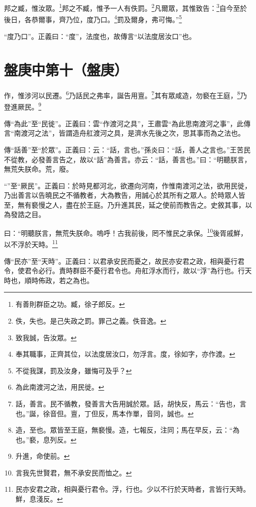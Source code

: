 邦之臧，惟汝眾。\footnote{有善則群臣之功。臧，徐子郎反。}邦之不臧，惟予一人有佚罰。\footnote{佚，失也。是己失政之罰。罪己之義。佚音逸。}凡爾眾，其惟致告：\footnote{致我誠，告汝眾。}自今至於後日，各恭爾事，齊乃位，度乃口。\footnote{奉其職事，正齊其位，以法度居汝口，勿浮言。度，徐如字，亦作渡。}罰及爾身，弗可悔。”\footnote{不從我謀，罰及汝身，雖悔可及乎？}

{\noindent\shu{}\fzkt “度乃口”。正義曰：“度”，法度也，故傳言“以法度居汝口”也。 \par}

\section{盤庚中第十（盤庚）}

作，惟涉河以民遷。\footnote{為此南渡河之法，用民徙。}乃話民之弗率，誕告用亶。\footnote{話，善言。民不循教，發善言大告用誠於眾。話，胡快反，馬云：“告也，言也。”誕，徐音但。亶，丁但反，馬本作單，音同，誠也。}其有眾咸造，勿褻在王庭，\footnote{造，至也。眾皆至王庭，無褻慢。造，七報反，注同；馬在早反，云：“為也。”褻，息列反。}乃登進厥民。\footnote{升進，命使前。}

{\noindent\zhuan{}\fzbyks 傳“為此”至“民徙”。正義曰：雲“作渡河之具”，王肅雲“為此思南渡河之事”，此傳言“南渡河之法”，皆謂造舟舡渡河之具，是濟水先後之次，思其事而為之法也。 \par}

{\noindent\zhuan{}\fzbyks 傳“話善”至“於眾”。正義曰：云：“話，言也。”孫炎曰：“話，善人之言也。”王苦民不從教，必發善言告之，故以“話”為善言。亦云：“話，善言也。”曰：“明聽朕言，無荒失朕命。荒，廢。 \par}

{\noindent\shu{}\fzkt “”至“厥民”。正義曰：於時見都河北，欲遷向河南，作惟南渡河之法，欲用民徙，乃出善言以告曉民之不循教者，大為教告，用誠心於其所有之眾人。於時眾人皆至，無有褻慢之人，盡在於王庭。乃升進其民，延之使前而教告之。史敘其事，以為發誥之目。 \par}

曰：“明聽朕言，無荒失朕命。嗚呼！古我前後，罔不惟民之承保。\footnote{言我先世賢君，無不承安民而恤之。}後胥戚鮮，以不浮於天時。\footnote{民亦安君之政，相與憂行君令。浮，行也。少以不行於天時者，言皆行天時。鮮，息淺反。}

{\noindent\zhuan{}\fzbyks 傳“民亦”至“天時”。正義曰：以君承安民而憂之，故民亦安君之政，相與憂行君令，使君令必行。責時群臣不憂行君令也。舟舡浮水而行，故以“浮”為行也。行天時也，順時佈政，若之為也。 \par}

